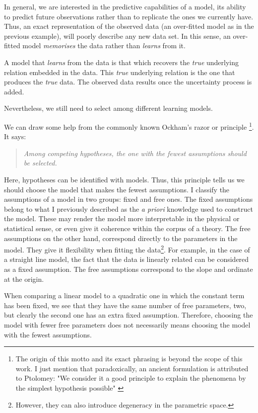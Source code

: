 In general, we are interested in the predictive capabilities of a model, its ability to predict future observations rather than to replicate the ones we currently have. Thus, an exact representation of the observed data (an over-fitted model as in the previous example), will poorly describe any new data set. In this sense, an over-fitted model \emph{memorises} the data rather than \emph{learns} from it.

A model that \emph{learns} from the data is that which recovers the \emph{true} underlying relation embedded in the data. This \emph{true} underlying relation is the one that produces the \emph{true} data. The observed data results once the uncertainty process is added. 

Nevertheless, we still need to select among different learning models.  

We can draw some help from the commonly known Ockham's razor or principle \footnote{The origin of this motto and its exact phrasing is beyond the scope of this work. I just mention that paradoxically, an ancient formulation is attributed to Ptolomey: "We consider it a good principle to explain the phenomena by the simplest hypothesis possible" \citep{Franklin2002}}. It says:
\begin{quotation}
\textit{Among competing hypotheses, the one with the fewest assumptions should be selected.}
\end{quotation}

Here, hypotheses can be identified with models. Thus, this principle tells us we should choose the model that makes the fewest assumptions. I classify the assumptions of a model in two groups: fixed and free ones. The fixed assumptions belong to what I previously described as the \emph{a priori} knowledge used to construct the model. These may render the model more interpretable in the physical or statistical sense, or even give it coherence within the corpus of a theory. The free assumptions on the other hand, correspond directly to the parameters in the model. They give it flexibility when fitting the data\footnote{However, they can also introduce degeneracy in the parametric space.}. For example, in the case of a straight line model, the fact that the data is linearly related can be considered as a fixed assumption. The free assumptions correspond to the slope and ordinate at the origin. 

When comparing a linear model to a quadratic one in which the constant term has been fixed, we see that they have the same number of free parameters, two, but clearly the second one has an extra fixed assumption. Therefore, choosing the model with fewer free parameters does not necessarily means choosing the model with the fewest assumptions.


